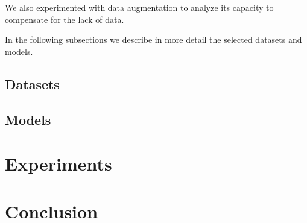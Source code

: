 \documentclass[runningheads,a4paper]{llncs}
\begin{document}
We also experimented with data augmentation to analyze its capacity to compensate for the lack of data.

In the following subsections we describe in more detail the selected datasets and models.

\subsection{Datasets}
\label{sec:datasets}


\subsection{Models}
\label{sec:models}


\section{Experiments}
\label{sec:experiments}


\section{Conclusion}
\label{sec:conclusion}




\end{document}
